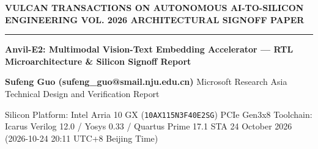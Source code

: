 \documentclass[11pt,a4paper]{article}
\begin{document}
{\scriptsize\sffamily\textcolor{vulcan}{\textbf{VULCAN TRANSACTIONS ON AUTONOMOUS AI-TO-SILICON ENGINEERING \hfill VOL. 2026 \textperiodcentered{} ARCHITECTURAL SIGNOFF PAPER}}\par}

\vspace{1pt}\textcolor{vulcan}{\rule{\textwidth}{1.2pt}}\vspace{4pt}

\begin{center}

{\sffamily\LARGE\bfseries Anvil-E2: Multimodal Vision-Text Embedding Accelerator — RTL Microarchitecture \& Silicon Signoff Report\par}\vspace{3pt}

{\small\sffamily\textbf{Sufeng Guo (\allowbreak{}sufeng\_\allowbreak{}guo@smail.nju.edu.cn)\allowbreak{}} \textperiodcentered{} Microsoft Research Asia \textperiodcentered{} Technical Design and Verification Report\par}\vspace{1pt}

{\scriptsize\sffamily\textcolor{black!75}{Silicon Platform: Intel Arria 10 GX (\texttt{10AX115N3F40E2SG}) PCIe Gen3x8 \textperiodcentered{} Toolchain: Icarus Verilog 12.0 / Yosys 0.33 / Quartus Prime 17.1 STA \textperiodcentered{} 24 October 2026 (\allowbreak{}2026-10-24 20:11 UTC+\allowbreak{}8 Beijing Time)\allowbreak{}}\par}

\end{center}\vspace{2pt}
\end{document}
